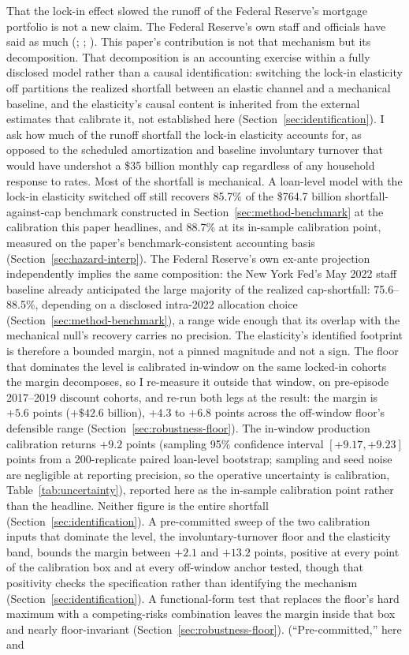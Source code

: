 \documentclass[12pt]{article}
\begin{document}
That the lock-in effect slowed the runoff of the Federal Reserve's mortgage portfolio is not a new claim. The Federal Reserve's own staff and officials have said as much (\citealp{na2024}; \citealp{perli2024}; \citealp{hammack2025}). This paper's contribution is not that mechanism but its decomposition. That decomposition is an accounting exercise within a fully disclosed model rather than a causal identification: switching the lock-in elasticity off partitions the realized shortfall between an elastic channel and a mechanical baseline, and the elasticity's causal content is inherited from the external estimates that calibrate it, not established here (Section~\ref{sec:identification}). I ask how much of the runoff shortfall the lock-in elasticity accounts for, as opposed to the scheduled amortization and baseline involuntary turnover that would have undershot a \$35 billion monthly cap regardless of any household response to rates. Most of the shortfall is mechanical. A loan-level model with the lock-in elasticity switched off still recovers 85.7\% of the \$764.7 billion shortfall-against-cap benchmark constructed in Section~\ref{sec:method-benchmark} at the calibration this paper headlines, and 88.7\% at its in-sample calibration point, measured on the paper's benchmark-consistent accounting basis (Section~\ref{sec:hazard-interp}). The Federal Reserve's own ex-ante projection independently implies the same composition: the New York Fed's May 2022 staff baseline already anticipated the large majority of the realized cap-shortfall: 75.6--88.5\%, depending on a disclosed intra-2022 allocation choice (Section~\ref{sec:method-benchmark}), a range wide enough that its overlap with the mechanical null's recovery carries no precision. The elasticity's identified footprint is therefore a bounded margin, not a pinned magnitude and not a sign. The floor that dominates the level is calibrated in-window on the same locked-in cohorts the margin decomposes, so I re-measure it outside that window, on pre-episode 2017--2019 discount cohorts, and re-run both legs at the result: the margin is $+5.6$ points ($+\$42.6$ billion), $+4.3$ to $+6.8$ points across the off-window floor's defensible range (Section~\ref{sec:robustness-floor}). The in-window production calibration returns $+9.2$ points (sampling 95\% confidence interval $[+9.17, +9.23]$ points from a 200-replicate paired loan-level bootstrap; sampling and seed noise are negligible at reporting precision, so the operative uncertainty is calibration, Table~\ref{tab:uncertainty}), reported here as the in-sample calibration point rather than the headline. Neither figure is the entire shortfall (Section~\ref{sec:identification}). A pre-committed sweep of the two calibration inputs that dominate the level, the involuntary-turnover floor and the elasticity band, bounds the margin between $+2.1$ and $+13.2$ points, positive at every point of the calibration box and at every off-window anchor tested, though that positivity checks the specification rather than identifying the mechanism (Section~\ref{sec:identification}). A functional-form test that replaces the floor's hard maximum with a competing-risks combination leaves the margin inside that box and nearly floor-invariant (Section~\ref{sec:robustness-floor}). (``Pre-committed,'' here and 
\end{document}
